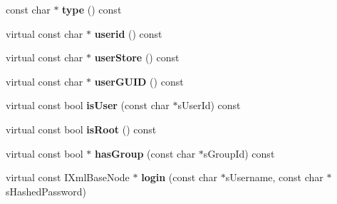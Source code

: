\begin{DoxyCompactItemize}
\item 
\hypertarget{classgeneral__server_1_1RepositorySaveSecurityContext_a5a8d69a44a0e77f74d266b99870f640e}{const char $\ast$ {\bfseries type} () const }\label{classgeneral__server_1_1RepositorySaveSecurityContext_a5a8d69a44a0e77f74d266b99870f640e}

\item 
\hypertarget{classgeneral__server_1_1RepositorySaveSecurityContext_a70d527dd1a1cb723fef189748c2def0d}{virtual const char $\ast$ {\bfseries userid} () const }\label{classgeneral__server_1_1RepositorySaveSecurityContext_a70d527dd1a1cb723fef189748c2def0d}

\item 
\hypertarget{classgeneral__server_1_1RepositorySaveSecurityContext_af6f96ce5b95897ef8af7ff11d23df791}{virtual const char $\ast$ {\bfseries user\-Store} () const }\label{classgeneral__server_1_1RepositorySaveSecurityContext_af6f96ce5b95897ef8af7ff11d23df791}

\item 
\hypertarget{classgeneral__server_1_1RepositorySaveSecurityContext_a198ec15233ab9ddb67422fe4042df822}{virtual const char $\ast$ {\bfseries user\-G\-U\-I\-D} () const }\label{classgeneral__server_1_1RepositorySaveSecurityContext_a198ec15233ab9ddb67422fe4042df822}

\item 
\hypertarget{classgeneral__server_1_1RepositorySaveSecurityContext_ac7b816a124079338ced115dc4f529afc}{virtual const bool {\bfseries is\-User} (const char $\ast$s\-User\-Id) const }\label{classgeneral__server_1_1RepositorySaveSecurityContext_ac7b816a124079338ced115dc4f529afc}

\item 
\hypertarget{classgeneral__server_1_1RepositorySaveSecurityContext_a4d6da5448bef16677df16f6fa6f00e5c}{virtual const bool {\bfseries is\-Root} () const }\label{classgeneral__server_1_1RepositorySaveSecurityContext_a4d6da5448bef16677df16f6fa6f00e5c}

\item 
\hypertarget{classgeneral__server_1_1RepositorySaveSecurityContext_aa91c1faca4cbd6ce2e5aa250fd6dc258}{virtual const bool $\ast$ {\bfseries has\-Group} (const char $\ast$s\-Group\-Id) const }\label{classgeneral__server_1_1RepositorySaveSecurityContext_aa91c1faca4cbd6ce2e5aa250fd6dc258}

\item 
\hypertarget{classgeneral__server_1_1RepositorySaveSecurityContext_a1a1038c1893aee02cc8233f69bd2dc09}{virtual const \-I\-Xml\-Base\-Node $\ast$ {\bfseries login} (const char $\ast$s\-Username, const char $\ast$s\-Hashed\-Password)}\label{classgeneral__server_1_1RepositorySaveSecurityContext_a1a1038c1893aee02cc8233f69bd2dc09}


\end{DoxyCompactItemize}
